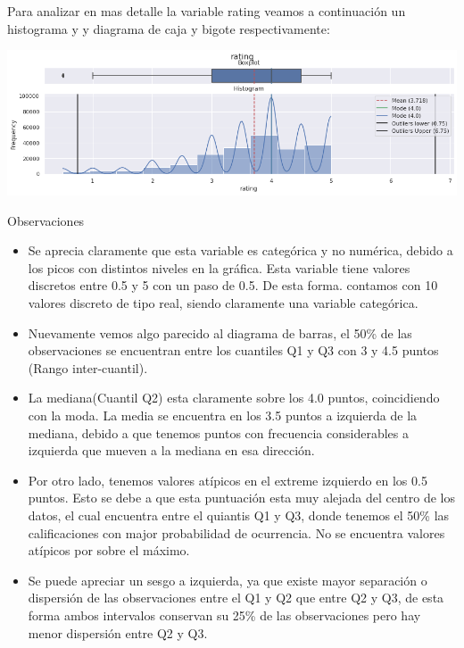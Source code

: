 \documentclass[11pt,a4paper,twoside]{thesis}
\begin{document}
Para analizar en mas detalle la variable rating veamos a continuación un histograma y y diagrama de caja y bigote respectivamente:

\begin{center}
	\includegraphics[width=15cm]{./images/rating-boxplot-histplot.png}
\end{center}
\begin{description}
	\item[Observaciones]
\end{description}
\begin{itemize}
	\item Se aprecia claramente que esta variable es categórica y no numérica, debido a los picos con distintos niveles en la gráfica. Esta variable tiene valores discretos entre 0.5 y 5 con un paso de 0.5. De esta forma. contamos con 10 valores discreto de tipo real, siendo claramente una variable categórica.
	\item Nuevamente vemos algo parecido al diagrama de barras, el 50\% de las observaciones se encuentran entre los cuantiles Q1 y Q3 con 3 y 4.5 puntos (Rango inter-cuantil).
	\item La mediana(Cuantil Q2) esta claramente sobre los 4.0 puntos, coincidiendo con la moda. La media se encuentra en los 3.5 puntos a izquierda de la mediana, debido a que tenemos puntos con frecuencia considerables a izquierda que mueven a la mediana en esa dirección.
	\item Por otro lado, tenemos valores atípicos en el extreme izquierdo en los 0.5 puntos. Esto se debe a que esta puntuación esta muy alejada del centro de los datos, el cual encuentra entre el quiantis Q1 y Q3, donde tenemos el 50\% las calificaciones con major probabilidad de ocurrencia. No se encuentra valores atípicos por sobre el máximo.
	\item Se puede apreciar un sesgo a izquierda, ya que existe mayor separación o dispersión de las observaciones entre el Q1 y Q2 que entre Q2 y Q3, de esta forma ambos intervalos conservan su 25\% de las observaciones pero hay menor dispersión entre Q2 y Q3.
\end{itemize}
\end{document}
